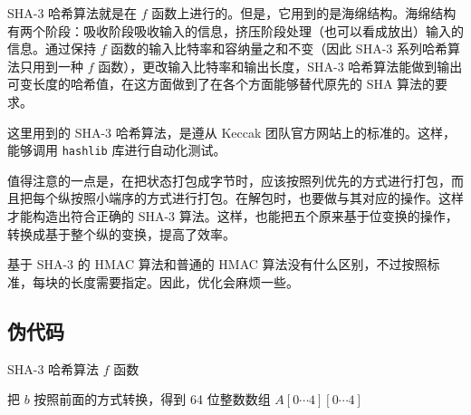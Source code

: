 \documentclass[12pt,a4paper]{article}
\begin{document}
SHA-3 哈希算法就是在 $ f $ 函数上进行的。但是，它用到的是海绵结构。海绵结构有两个阶段：吸收阶段吸收输入的信息，挤压阶段处理（也可以看成放出）输入的信息。通过保持 $ f $ 函数的输入比特率和容纳量之和不变（因此 SHA-3 系列哈希算法只用到一种 $ f $ 函数），更改输入比特率和输出长度，SHA-3 哈希算法能做到输出可变长度的哈希值，在这方面做到了在各个方面能够替代原先的 SHA 算法的要求。

这里用到的 SHA-3 哈希算法，是遵从 Keccak 团队官方网站上的标准的。这样，能够调用 \texttt{hashlib} 库进行自动化测试。

值得注意的一点是，在把状态打包成字节时，应该按照列优先的方式进行打包，而且把每个纵按照小端序的方式进行打包。在解包时，也要做与其对应的操作。这样才能构造出符合正确的 SHA-3 算法。这样，也能把五个原来基于位变换的操作，转换成基于整个纵的变换，提高了效率。

基于 SHA-3 的 HMAC 算法和普通的 HMAC 算法没有什么区别，不过按照标准，每块的长度需要指定。因此，优化会麻烦一些。

\subsection*{伪代码}

\begin{algorithm}[H]
\caption{SHA-3 哈希算法 $ f $ 函数}

把 $ b $ 按照前面的方式转换，得到 64 位整数数组 $ A[0 \cdots 4][0 \cdots 4] $


\end{algorithm}
\end{document}
